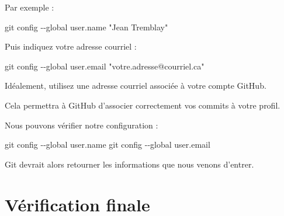 \documentclass[
  letterpaper,
  DIV=11,
  numbers=noendperiod]{scrreprt}
\newenvironment{Shaded}{\begin{snugshade}}{\end{snugshade}}
\newcommand{\AttributeTok}[1]{\textcolor[rgb]{0.40,0.45,0.13}{#1}}
\newcommand{\FunctionTok}[1]{\textcolor[rgb]{0.28,0.35,0.67}{#1}}
\newcommand{\NormalTok}[1]{\textcolor[rgb]{0.00,0.23,0.31}{#1}}
\newcommand{\StringTok}[1]{\textcolor[rgb]{0.13,0.47,0.30}{#1}}
\begin{document}
Par exemple :

\begin{Shaded}
\begin{Highlighting}[]
\FunctionTok{git}\NormalTok{ config }\AttributeTok{{-}{-}global}\NormalTok{ user.name }\StringTok{"Jean Tremblay"}
\end{Highlighting}
\end{Shaded}

Puis indiquez votre adresse courriel :

\begin{Shaded}
\begin{Highlighting}[]
\FunctionTok{git}\NormalTok{ config }\AttributeTok{{-}{-}global}\NormalTok{ user.email }\StringTok{"votre.adresse@courriel.ca"}
\end{Highlighting}
\end{Shaded}

\begin{tcolorbox}[enhanced jigsaw, arc=.35mm, title=\textcolor{quarto-callout-note-color}{\faInfo}\hspace{0.5em}{Quelle adresse utiliser?}, colback=white, left=2mm, rightrule=.15mm, toptitle=1mm, opacityback=0, bottomtitle=1mm, breakable, colframe=quarto-callout-note-color-frame, coltitle=black, toprule=.15mm, titlerule=0mm, opacitybacktitle=0.6, bottomrule=.15mm, colbacktitle=quarto-callout-note-color!10!white, leftrule=.75mm]

Idéalement, utilisez une adresse courriel associée à votre compte
GitHub.

Cela permettra à GitHub d'associer correctement vos commits à votre
profil.

\end{tcolorbox}

Nous pouvons vérifier notre configuration :

\begin{Shaded}
\begin{Highlighting}[]
\FunctionTok{git}\NormalTok{ config }\AttributeTok{{-}{-}global}\NormalTok{ user.name}
\FunctionTok{git}\NormalTok{ config }\AttributeTok{{-}{-}global}\NormalTok{ user.email}
\end{Highlighting}
\end{Shaded}

Git devrait alors retourner les informations que nous venons d'entrer.


\chapter{Vérification finale}\label{vuxe9rification-finale}
\end{document}
